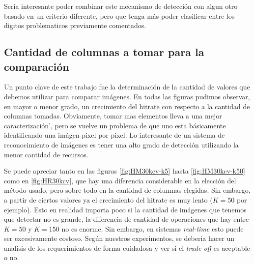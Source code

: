 Seria interesante poder combinar este mecanismo de detecci\'on con algun otro basado en un
criterio diferente, pero que tenga m\'as poder clasificar entre los digitos problematicos
previamente comentados.



\subsection{Cantidad de columnas a tomar para la comparaci\'on}
Un punto clave de este trabajo fue la determinaci\'on de la cantidad de valores que debemos
utilizar para comparar im\'agenes. En todas las figuras pudimos observar, en mayor o menor
grado, un crecimiento del hitrate con respecto a la cantidad de columnas tomadas.
Obviamente, tomar mas elementos lleva a una mejor caracterizaci\'on', pero se vuelve un problema
de que uno esta b\'asicamente identificando una im\'agen pixel por pixel. Lo interesante de un
sistema de reconocimiento de im\'agenes es tener una alto grado de detecci\'on utilizando la menor
cantidad de recursos.


Se puede apreciar tanto en las figuras \ref{fig:HM30kcv-k5} hasta \ref{fig:HM30kcv-k50} como
en \ref{fig:HR30kcv}, que hay una diferencia considerable en la elecci\'on del m\'etodo usado,
pero sobre todo en la cantidad de columnas elegidas. Sin embargo, a partir de ciertos valores
ya el crecimiento del hitrate es muy lento ($K=50$ por ejemplo). Esto en realidad importa poco
si la cantidad de im\'agenes que tenemos que detectar no es grande, la diferencia de cantidad
de operaciones que hay entre $K=50$ y $K=150$ no es enorme. Sin embargo, en sistemas \textit{real-time}
esto puede ser excesivamente costoso. Seg\'un nuestros experimentos, se deberia hacer un analisis
de los requerimientos de forma cuidadosa y ver si el \textit{trade-off} es aceptable o no.